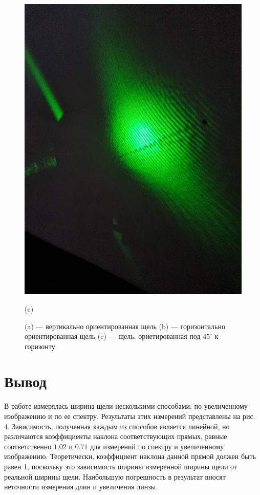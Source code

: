 \documentclass[a4paper,12pt]{article}
\begin{document}
\begin{figure}[H]
\begin{minipage}[b]{0.3\textwidth}
        \includegraphics[scale=0.08]{pic_3.png}
        \caption*{(c)}
    \end{minipage}
    \caption{
        (a) --- вертикально ориентированная щель
        (b) --- горизонтально ориентированная щель
        (c) --- щель, ориетированная под $45^\circ$ к горизонту
    }
\end{figure}


\section*{Вывод}
В работе измерялась ширина щели несколькими способами: по увеличенному изображению и по ее спектру. Результаты этих измерений представлены на рис. 4. Зависимость, полученная каждым из способов является линейной, но различаются коэффициенты наклона соответствующих прямых, равные соответственно $1.02$ и $0.71$ для измерений по спектру и увеличенному изображению. Теоретически, коэффициент наклона данной прямой должен быть равен 1, поскольку это зависимость ширины измеренной ширины щели от реальной ширины щели. Наибольшую погрешность в результат вносят неточности измерения длин и увеличения линзы.
\end{document}
